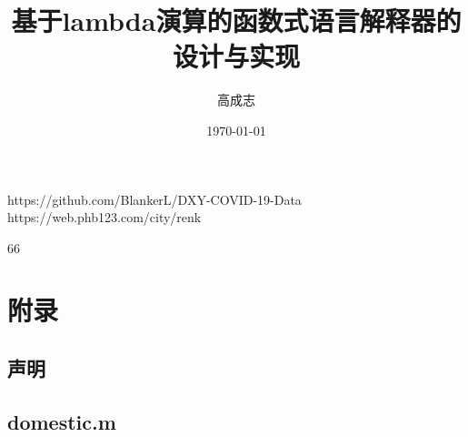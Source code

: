 \documentclass[UTF8]{ctexart}
\title{基于lambda演算的函数式语言解释器的设计与实现}
\author{高成志}
\date{\today}
\begin{document}
\maketitle
\newpage
\begin{abstract}
\end{abstract}
\newpage
\tableofcontents
\newpage
\section{}
\subsection{} 
\begin{thebibliography}{}
    https://github.com/BlankerL/DXY-COVID-19-Data
    https://web.phb123.com/city/renk 
\end{thebibliography}{66}
\newpage
\section{附录}
\subsection{声明}
\subsection{domestic.m}
\begin{lstlisting}
\end{lstlisting}
\end{document}
